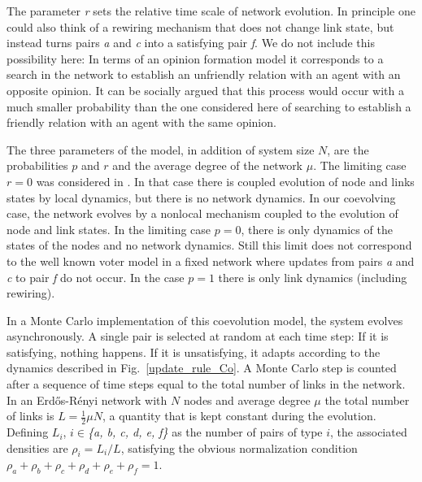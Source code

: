 \documentclass[aps,pre,notitlepage]{revtex4-1}
\begin{document}
The parameter \textit{r} sets the relative time scale of network evolution. In principle one could also think of a rewiring mechanism that does not change link state, but instead turns pairs \textit{a} and \textit{c} into a satisfying pair \textit{f}. We do not include this possibility here: In terms of an opinion formation model it corresponds to a search in the network to establish an unfriendly relation with an agent with an opposite opinion. It can be socially argued that this process would occur with a much smaller probability than the one considered here of searching to establish a friendly relation with an agent with the same opinion.

The three parameters of the model, in addition of system size $N$, are the probabilities $p$ and $r$ and the average degree of the network $\mu$. The limiting case $r=0$ was considered in \cite{saeedian2019absorbing}. In that case there is coupled evolution of node and links states by local dynamics, but there is no network dynamics. In our coevolving case, the network evolves by a nonlocal mechanism coupled to the evolution of node and link states. In the limiting case $p=0$, there is only dynamics of the states of the nodes and no network dynamics.
Still this limit does not correspond to the well known voter model in a fixed network \cite{vazquez2008analytical} where updates
from pairs \textit{a} and \textit{c} to pair \textit{f} do not occur. In the case $p=1$ there is only link dynamics
(including rewiring).
 
In a Monte Carlo implementation of this coevolution model, the system evolves asynchronously. A single pair is selected at random at each time step: If it is satisfying, nothing happens. If it is unsatisfying, it adapts according to the dynamics described in Fig.~\ref{update_rule_Co}. A Monte Carlo step is counted after a sequence of time steps equal to the total number of links in the network. In an Erd\H{o}s-R\'enyi network \cite{barrat2008dynamical} with $N$ nodes and average degree $\mu$ the total number of links is $L=\frac12 \mu N$, a quantity that is kept constant during the evolution. Defining $L_i$, \textit{$i\in$\{a, b, c, d, e, f\}} as the number of pairs of type $i$, the associated densities are $\rho_i=L_i/L$, satisfying the obvious normalization condition $\rho_{a}+\rho_{b}+\rho_{c}+\rho_{d}+\rho_{e}+\rho_{f}=1$.
\end{document}
